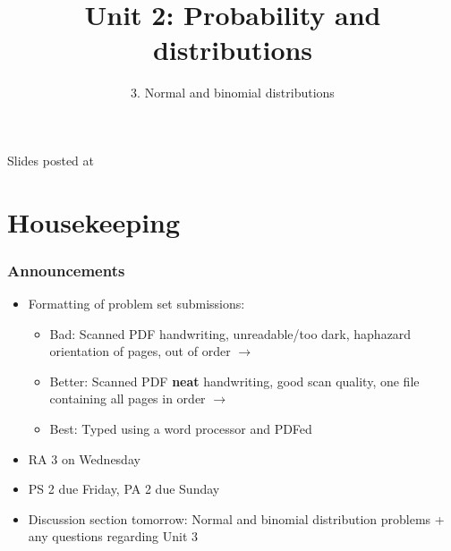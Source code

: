 \documentclass[11pt,containsverbatim,handout,xcolor=xelatex,dvipsnames,table]{beamer}
\title{Unit 2: Probability and distributions}
\subtitle{3. Normal and binomial distributions}
\author{\CourseName}
\date{}
\institute{\InstituteName}
\begin{document}



\begin{frame}[plain]

\titlepage

\vfill

{\scriptsize {} \hfill Slides posted at  \webURL{\CourseSite}}

\addtocounter{framenumber}{-1} 

\end{frame}


\section{Housekeeping}


\begin{frame}
\frametitle{Announcements}

\begin{itemize}

\item Formatting of problem set submissions:
\begin{itemize}
\item Bad: Scanned PDF handwriting, unreadable/too dark, haphazard orientation of pages, out
of order $\rightarrow$ 
\item Better: Scanned PDF \textbf{neat} handwriting, good scan quality, one file containing
all pages in order $\rightarrow$ 
\item Best: Typed using a word processor and PDFed
\end{itemize}

\item RA 3 on Wednesday

\item PS 2 due Friday, PA 2 due Sunday

\item Discussion section tomorrow: Normal and binomial distribution problems + any questions regarding Unit 3

\end{itemize}

\end{frame}
\end{document}
